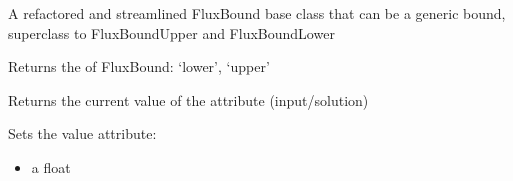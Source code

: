 \documentclass[letterpaper,10pt,english]{sphinxmanual}
\begin{document}

\begin{fulllineitems}
\label{\detokenize{modules_doc:cbmpy.CBModel.FluxBoundBase}}
\pysigstartsignatures
{}
\pysigstopsignatures
\sphinxAtStartPar
A refactored and streamlined FluxBound base class that can be a generic bound, superclass to FluxBoundUpper and FluxBoundLower

\begin{fulllineitems}
\label{\detokenize{modules_doc:cbmpy.CBModel.FluxBoundBase.getType}}
\pysigstartsignatures
{}
\pysigstopsignatures
\sphinxAtStartPar
Returns the  of FluxBound: ‘lower’, ‘upper’

\end{fulllineitems}


\begin{fulllineitems}
\label{\detokenize{modules_doc:cbmpy.CBModel.FluxBoundBase.getValue}}
\pysigstartsignatures
{}
\pysigstopsignatures
\sphinxAtStartPar
Returns the current value of the attribute (input/solution)

\end{fulllineitems}


\begin{fulllineitems}
\label{\detokenize{modules_doc:cbmpy.CBModel.FluxBoundBase.setValue}}
\pysigstartsignatures
{}
\pysigstopsignatures
\sphinxAtStartPar
Sets the value attribute:
\begin{itemize}
\item {} 
\sphinxAtStartPar
{} a float


\end{itemize}
\end{fulllineitems}
\end{fulllineitems}
\end{document}
